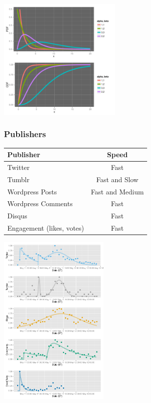 \documentclass{beamer}
\begin{document}

\begin{frame}
  \begin{center}
   \includegraphics[height=6cm]{./imgs/gammadist.pdf}
  \end{center}
\end{frame}

\begin{frame} \frametitle{Publishers}
\begin{table}
\begin{tabular}{l|c}
\hline
   {Publisher}   &   {Speed} \\
\hline 
    Twitter      &    Fast  \\ 
    Tumblr      &        Fast and Slow \\
    Wordpress Posts &   Fast and Medium   \\
    Wordpress Comments & Fast\\
    Disqus       &    Fast\\
    Engagement (likes, votes) &  Fast\\
\hline
\end{tabular}
\end{table}
\end{frame}


\begin{frame}
  \begin{center}
    \includegraphics[height=8.5cm]{./imgs/JPMorgan.pdf}
  \end{center}
\end{frame}
\end{document}
